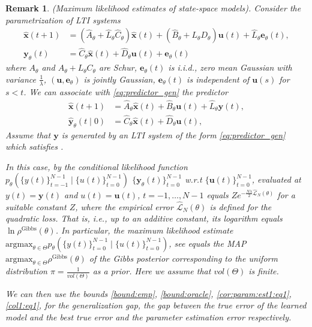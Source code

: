 \documentclass{article}
\def\rvu{{\mathbf{i}}}
\def\rvu{{\mathbf{u}}}
\def\rvy{{\mathbf{y}}}
\newtheorem{remark}[theorem]{Remark}
\newcommand{\e}{\mathbf{e}}
\newcommand{\x}{\mathbf{x}}
\newcommand{\y}{\mathbf{y}}
\begin{document}
 \begin{remark}(\emph{Maximum likelihood estimates   of state-space models}). 
  \label{rem:ml}
  Consider the parametrization of LTI systems
  \begin{align}
        \hat{\x}(t+1)&=(\hat{A}_\theta + \hat{L}_{\theta} \hat{C}_{\theta}) \hat{\x}(t)
         +(\hat{B}_\theta+L_{\theta}D_{\theta})\rvu(t)+\hat{L}_\theta\e_{\theta}(t),  \nonumber \\
        \y_\theta(t)&=\hat{C}_\theta\hat{\x}(t)+\hat{D}_\theta\rvu(t) + \e_{\theta}(t)
  \label{eq:predictor_gen}
 \end{align}
 where %
 $A_{\theta}$ and $A_{\theta}+L_{\theta}C_{\theta}$ are Schur, 
 $\e_{\theta}(t)$ is i.i.d., zero mean Gaussian with
 variance $\frac{1}{\lambda}$, $(\rvu,\e_{\theta})$ is jointly Gaussian, $\e_{\theta}(t)$ is independent of
 $\rvu(s)$ for $s < t$. 
 We can associate with \eqref{eq:predictor_gen} the predictor 
\begin{align}
        \hat{\x}(t+1)&=\hat{A}_\theta \hat{\x}(t)+\hat{B}_\theta \rvu(t)+\hat{L}_\theta\y(t),  \nonumber \\
        \hat{\y}_\theta(t \mid 0)&=\hat{C}_\theta\hat{\x}(t)+\hat{D}_\theta\rvu(t),
  \label{eq:predictor_gen1}
 \end{align}
 Assume that
 $\y$ is generated by an LTI system of the form \eqref{eq:predictor_gen} which satisfies  \cite[(1), INP B, page 427]{CainesBook}.

 In this case, by \cite[(2.7), page 422, Chapter 7]{CainesBook}
 the conditional likelihood function
 $p_{\theta}(\{y(t)\}_{t=-1}^{N-1} \mid \{u(t)\}_{t=0}^{N-1})$ 
 $\{\y_{\theta}(t)\}_{t=0}^{N-1}$ w.r.t
 $\{\rvu(t)\}_{t=0}^{N-1}$, evaluated at 
 $y(t)=\rvy(t)$ and $u(t)=\rvu(t)$, $t=-1,\ldots,N-1$
 equals 
 $Ze^{-\frac{N\lambda}{2} \hat{\mathcal{L}}_N(\theta)}$
 for a suitable constant $Z$, where the empirical error 
 $\hat{\mathcal{L}}_N(\theta)$ is defined for the quadratic loss. 
 That is, 
 i.e., up to an additive constant, its logarithm equals $\ln \rho^{\text{Gibbs}}(\theta)$.
 In particular, the maximum likelihood estimate 
 $\mathrm{argmax}_{\theta \in \Theta} p_{\theta}(\{y(t)\}_{t=0}^{N-1} \mid \{u(t)\}_{t=0}^{N-1})$, see
 \cite[Chapter 7,page 428]{CainesBook} 
 equals the MAP 
 $\mathrm{argmax}_{\theta \in \Theta} \rho^{\text{Gibbs}}(\theta)$ of the Gibbs posterior corresponding to the uniform distribution $\pi=\frac{1}{vol(\Theta)}$ as a prior. Here we assume that  $vol(\Theta)$  is finite.

 We can then use the bounds \eqref{bound:emp}, \eqref{bound:oracle}, \eqref{cor:param:est1:eq1}, \eqref{col1:eq1}, 
 for the generalization gap, the gap between the true error of the learned model and the best true error and the parameter estimation error respectively.
 \end{remark} 
\end{document}
